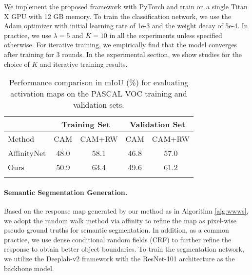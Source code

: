 \documentclass[10pt,twocolumn,letterpaper]{article}
\begin{document}
We implement the proposed framework with PyTorch and train on a single Titan X GPU with 12 GB memory. 
To train the classification network, we use the Adam optimizer \cite{kingma2014adam} with initial learning rate of 1e-3 and the weight decay of 5e-4.
In practice, we use $\lambda = 5$ and $K=10$ in all the experiments unless specified otherwise.
For iterative training, we empirically find that the model converges after training for 3 rounds.
In the experimental section, we show studies for the choice of $K$ and iterative training results.





\begin{table}[!t]
\caption{Performance comparison in mIoU (\%) for evaluating activation maps on the PASCAL VOC training and validation sets.}
	\vspace{-1mm}
	\small
	\centering
	\renewcommand{\arraystretch}{1.1}
	\setlength{\tabcolsep}{6pt}
	\begin{tabular}{lcc|cc}
		    \toprule
	        & \multicolumn{2}{c}{Training Set} & \multicolumn{2}{c}{Validation Set} \\
		    \midrule
		    Method & CAM & CAM+RW & CAM & CAM+RW \\
		    \midrule
		    AffinityNet \cite{ahn2018learning} & 48.0 & 58.1 & 46.8 & 57.0 \\
		    Ours & 50.9 & 63.4 & 49.6 & 61.2 \\
		\bottomrule
	\label{table: compare_cam}
	\end{tabular}
	\vspace{-8mm}
\end{table}



\paragraph{Semantic Segmentation Generation.}
Based on the response map generated by our method as in Algorithm \ref{alg:wwws}, we adopt the random walk method via affinity \cite{ahn2018learning} to refine the map as pixel-wise pseudo ground truths for semantic segmentation.
In addition, as a common practice, we use dense conditional random fields (CRF) \cite{crf} to further refine the response to obtain better object boundaries.
To train the segmentation network, we utilize the Deeplab-v2 framework \cite{deeplab} with the ResNet-101 architecture \cite{He_2016_CVPR} as the backbone model.
\end{document}
